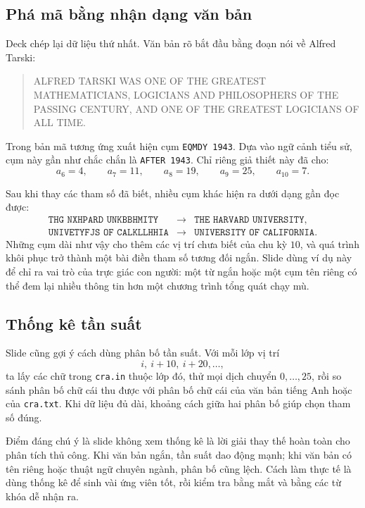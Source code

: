 \documentclass[11pt]{article}
\begin{document}
\subsection{Phá mã bằng nhận dạng văn bản}

Deck chép lại dữ liệu thứ nhất. Văn bản rõ bắt đầu bằng đoạn nói về Alfred
Tarski:
\begin{quote}
ALFRED TARSKI WAS ONE OF THE GREATEST MATHEMATICIANS, LOGICIANS AND
PHILOSOPHERS OF THE PASSING CENTURY, AND ONE OF THE GREATEST LOGICIANS OF
ALL TIME.
\end{quote}
Trong bản mã tương ứng xuất hiện cụm \texttt{EQMDY 1943}. Dựa vào ngữ cảnh
tiểu sử, cụm này gần như chắc chắn là \texttt{AFTER 1943}. Chỉ riêng giả thiết
này đã cho:
\[
  a_6=4,\qquad a_7=11,\qquad a_8=19,\qquad a_9=25,\qquad a_{10}=7.
\]

Sau khi thay các tham số đã biết, nhiều cụm khác hiện ra dưới dạng gần đọc
được:
\[
\begin{array}{rcl}
\texttt{THG NXHPARD UNKBBHMITY} &\to& \texttt{THE HARVARD UNIVERSITY},\\
\texttt{UNIVETYFJS OF CALKLLHHIA} &\to& \texttt{UNIVERSITY OF CALIFORNIA}.
\end{array}
\]
Những cụm dài như vậy cho thêm các vị trí chưa biết của chu kỳ \(10\), và quá
trình khôi phục trở thành một bài điền tham số tương đối ngắn. Slide dùng ví
dụ này để chỉ ra vai trò của trực giác con người: một từ ngắn hoặc một cụm
tên riêng có thể đem lại nhiều thông tin hơn một chương trình tổng quát chạy
mù.

\subsection{Thống kê tần suất}

Slide cũng gợi ý cách dùng phân bố tần suất. Với mỗi lớp vị trí
\[
  i,\ i+10,\ i+20,\ldots,
\]
ta lấy các chữ trong \texttt{cra.in} thuộc lớp đó, thử mọi dịch chuyển
\(0,\ldots,25\), rồi so sánh phân bố chữ cái thu được với phân bố chữ cái của
văn bản tiếng Anh hoặc của \texttt{cra.txt}. Khi dữ liệu đủ dài, khoảng cách
giữa hai phân bố giúp chọn tham số đúng.

Điểm đáng chú ý là slide không xem thống kê là lời giải thay thế hoàn toàn
cho phân tích thủ công. Khi văn bản ngắn, tần suất dao động mạnh; khi văn bản
có tên riêng hoặc thuật ngữ chuyên ngành, phân bố cũng lệch. Cách làm thực tế
là dùng thống kê để sinh vài ứng viên tốt, rồi kiểm tra bằng mắt và bằng các
từ khóa dễ nhận ra.
\end{document}
